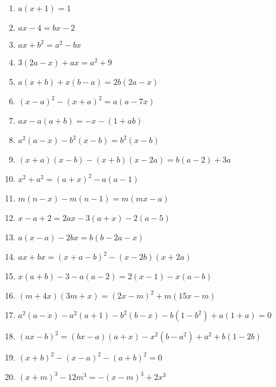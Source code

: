 \documentclass{article}
\begin{document}
\begin{enumerate}[label=\bfseries\small 143.\arabic*, itemsep=3cm]
\large

\item $a(x+1) = 1$

\item $ax-4 = bx-2$

\item $ax+b^2 = a^2 - bx$

\item $3(2a-x) + ax = a^2 + 9$

\item $a(x+b) + x(b-a) = 2b(2a-x)$

\item $(x-a)^2 - (x+a)^2 = a(a-7x)$

\item $ax-a(a+b) = -x - (1+ab)$

\item $a^2(a-x) - b^2(x-b) = b^2(x-b)$

\item $(x+a)(x-b) - (x+b)(x-2a) = b(a-2) + 3a$

\item $x^2 + a^2 = (a+x)^2 - a(a-1)$

\item $m(n-x) - m(n-1) = m(mx-a)$

\item $x-a+2=2ax-3(a+x)-2(a-5)$

\item $a(x-a)-2bx=b(b-2a-x)$

\item $ax+bx=(x+a-b)^2-(x-2b)(x+2a)$

\item $x(a+b)-3-a(a-2)=2(x-1)-x(a-b)$

\item $(m+4x)(3m+x)=(2x-m)^2+m(15x-m)$

\item $a^2(a-x)-a^2(a+1)-b^2(b-x)-b(1-b^2)+a(1+a)=0$

\item $(ax-b)^2=(bx-a)(a+x)-x^2(b-a^2)+a^2+b(1-2b)$

\item $(x+b)^2-(x-a)^2-(a+b)^2=0$

\item $(x+m)^3-12m^3=-{(x-m)}^3+2x^3$


\end{enumerate}
\end{document}
